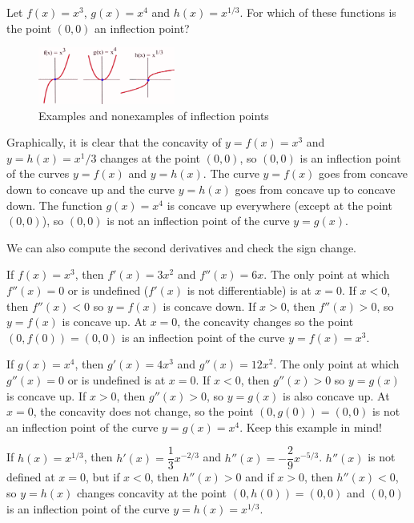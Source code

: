 \begin{example}
Let $f(x)=x^3$, $g(x)=x^4$ and $h(x)=x^{1/3}$. For which of these functions is the point $(0,0)$ an inflection point?

\begin{figure}[!ht]
  \centering
    \includegraphics[width=0.4\textwidth]{img/chap3/image048.png}
    \caption{Examples and nonexamples of inflection points}
    \label{fig:3-3-curves}
\end{figure}

\begin{solution} Graphically, it is clear that the concavity of $y=f(x)=x^3$ and $y=h(x)=x^1/3$ changes at the point $(0,0)$, so $(0,0)$ is an inflection point of the curves $y=f(x)$ and $y=h(x)$. The curve $y=f(x)$ goes from concave down to concave up and the curve $y=h(x)$ goes from concave up to concave down. The function $g(x)=x^4$ is concave up everywhere (except at the point $(0,0)$), so $(0,0)$ is not an inflection point of the curve $y=g(x)$.

We can also compute the second derivatives and check the sign change.

If $f(x)=x^3$, then $f'(x)=3x^2$ and $f''(x)=6x$. The only point at which $f''(x)=0$ or is undefined ($f'(x)$ is not differentiable) is at $x=0$. If $x<0$, then $f''(x)<0$ so $y=f(x)$ is concave down. If $x>0$, then $f''(x)>0$, so $y=f(x)$ is concave up. At $x=0$, the concavity changes so the point $(0,f(0))=(0,0)$ is an inflection point of the curve $y=f(x)=x^3$.

If $g(x)=x^4$, then $g'(x)=4x^3$ and $g''(x)=12x^2$. The only point at which $g''(x)=0$ or is undefined is at $x=0$. If $x<0$, then $g''(x)>0$ so $y=g(x)$ is concave up. If $x>0$, then $g''(x)>0$, so $y=g(x)$ is also concave up. At $x=0$, the concavity does not change, so the point $(0,g(0))=(0,0)$ is not an inflection point of the curve $y=g(x)=x^4$. Keep this example in mind!

If $h(x)=x^{1/3}$, then $h'(x)=\dfrac{1}{3}x^{-2/3}$ and $h''(x)=-\dfrac{2}{9}x^{-5/3}$. $h''(x)$ is not defined at $x=0$, but if $x<0$, then $h''(x)>0$ and if $x>0$, then $h''(x)<0$, so $y=h(x)$ changes concavity at the point $(0,h(0)) = (0,0)$ and $(0,0)$ is an inflection point of the curve $y=h(x)=x^{1/3}$.
\end{solution}\end{example}

